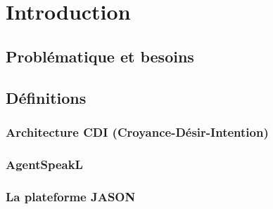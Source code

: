 \chapter{Introduction}
\section{Problématique et besoins}
\section{Définitions}
\subsection{Architecture CDI (Croyance-Désir-Intention)}
\subsection{AgentSpeakL}
\subsection{La plateforme JASON}